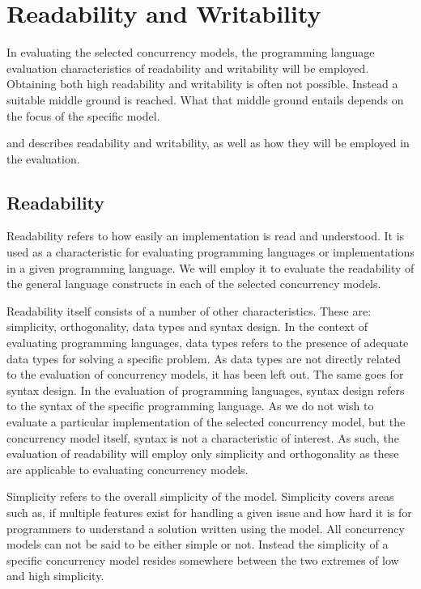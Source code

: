 \section{Readability and Writability}
In evaluating the selected concurrency models, the programming language evaluation characteristics of readability and writability will be employed. Obtaining both high readability and writability is often not possible. Instead a suitable middle ground is reached. What that middle ground entails depends on the focus of the specific model.

 and  describes readability and writability, as well as how they will be employed in the evaluation.

\subsection{Readability}\label{sec:readability}
Readability refers to how easily an implementation is read and understood\cite[p. 8]{sebestaProLang}. It is used as a characteristic for evaluating programming languages or implementations in a given programming language. We will employ it to evaluate the readability of the general language constructs in each of the selected concurrency models.

Readability itself consists of a number of other characteristics. These are: simplicity, orthogonality, data types and syntax design. In the context of evaluating programming languages, data types refers to the presence of adequate data types for solving a specific problem. As data types are not directly related to the evaluation of concurrency models, it has been left out. The same goes for syntax design. In the evaluation of programming languages, syntax design refers to the syntax of the specific programming language. As we do not wish to evaluate a particular implementation of the selected concurrency model, but the concurrency model itself, syntax is not a characteristic of interest. As such, the evaluation of readability will employ only simplicity and orthogonality as these are applicable to evaluating concurrency models.

Simplicity refers to the overall simplicity of the model\cite[p. 8]{sebestaProLang}. Simplicity covers areas such as, if multiple features exist for handling a given issue and how hard it is for programmers to understand a solution written using the model. All concurrency models can not be said to be either simple or not. Instead the simplicity of a specific concurrency model resides somewhere between the two extremes of low and high simplicity.  

